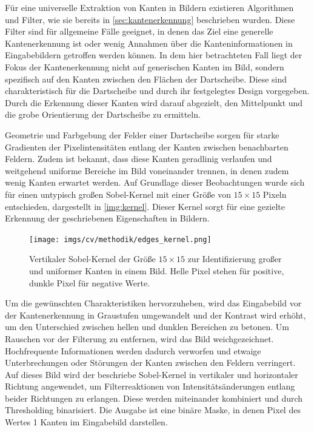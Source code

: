 Für eine universelle Extraktion von Kanten in Bildern existieren Algorithmen und Filter, wie sie bereits in \autoref{sec:kantenerkennung} beschrieben wurden. Diese Filter sind für allgemeine Fälle geeignet, in denen das Ziel eine generelle Kantenerkennung ist oder wenig Annahmen über die Kanteninformationen in Eingabebildern getroffen werden können. In dem hier betrachteten Fall liegt der Fokus der Kantenerkennung nicht auf generischen Kanten im Bild, sondern spezifisch auf den Kanten zwischen den Flächen der Dartscheibe. Diese sind charakteristisch für die Dartscheibe und durch ihr festgelegtes Design vorgegeben. Durch die Erkennung dieser Kanten wird darauf abgezielt, den Mittelpunkt und die grobe Orientierung der Dartscheibe zu ermitteln.

Geometrie und Farbgebung der Felder einer Dartscheibe sorgen für starke Gradienten der Pixelintensitäten entlang der Kanten zwischen benachbarten Feldern. Zudem ist bekannt, dass diese Kanten geradlinig verlaufen und weitgehend uniforme Bereiche im Bild voneinander trennen, in denen zudem wenig Kanten erwartet werden. Auf Grundlage dieser Beobachtungen wurde sich für einen untypisch großen Sobel-Kernel mit einer Größe von $15 \times 15$ Pixeln entschieden, dargestellt in \autoref{img:kernel}. Dieser Kernel sorgt für eine gezielte Erkennung der geschriebenen Eigenschaften in Bildern.

\begin{figure}
    \centering
    \texttt{[image: imgs/cv/methodik/edges\_kernel.png]}
    \caption{Vertikaler Sobel-Kernel der Größe $15\times15$ zur Identifizierung großer und uniformer Kanten in einem Bild. Helle Pixel stehen für positive, dunkle Pixel für negative Werte.}
    \label{img:kernel}
\end{figure}

Um die gewünschten Charakteristiken hervorzuheben, wird das Eingabebild vor der Kantenerkennung in Graustufen umgewandelt und der Kontrast wird erhöht, um den Unterschied zwischen hellen und dunklen Bereichen zu betonen. Um Rauschen vor der Filterung zu entfernen, wird das Bild weichgezeichnet. Hochfrequente Informationen werden dadurch verworfen und etwaige Unterbrechungen oder Störungen der Kanten zwischen den Feldern verringert. Auf dieses Bild wird der beschriebe Sobel-Kernel in vertikaler und horizontaler Richtung angewendet, um Filterreaktionen von Intensitätsänderungen entlang beider Richtungen zu erlangen. Diese werden miteinander kombiniert und durch Thresholding binarisiert. Die Ausgabe ist eine binäre Maske, in denen Pixel des Wertes 1 Kanten im Eingabebild darstellen.

